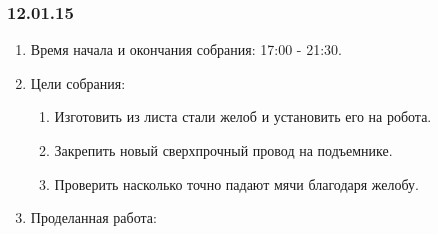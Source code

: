 \subsubsection{12.01.15}
\begin{enumerate}
	
	\item Время начала и окончания собрания: 17:00 - 21:30.
	
	\item Цели собрания: 
	\begin{enumerate}
		
	    \item Изготовить из листа стали желоб и установить его на робота.
			
		\item Закрепить новый сверхпрочный провод на подъемнике.
		
		\item Проверить насколько точно падают мячи благодаря желобу.
	    
	\end{enumerate}

	\item Проделанная работа:
	\begin{enumerate}
		

\end{enumerate}
\end{enumerate}
